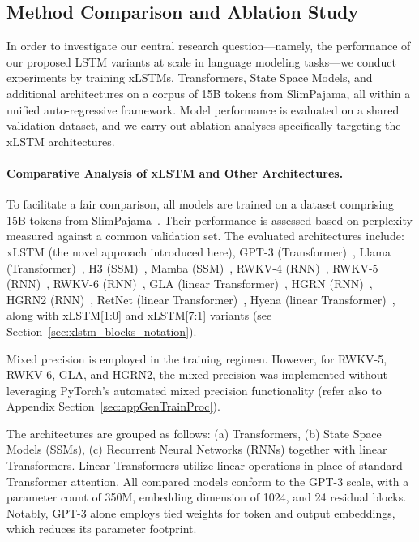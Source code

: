\subsection{Method Comparison and Ablation Study}
\label{sec:ExpComparison}

In order to investigate our central research question—namely, the performance of our proposed LSTM variants at scale in language modeling tasks—we conduct experiments by training xLSTMs, Transformers, State Space Models, and additional architectures on a corpus of 15B tokens from SlimPajama, all within a unified auto-regressive framework. Model performance is evaluated on a shared validation dataset, and we carry out ablation analyses specifically targeting the xLSTM architectures.

\paragraph{Comparative Analysis of xLSTM and Other Architectures.} To facilitate a fair comparison, all models are trained on a dataset comprising 15B tokens from SlimPajama~\citep{Soboleva:23}. Their performance is assessed based on perplexity measured against a common validation set. The evaluated architectures include: xLSTM (the novel approach introduced here), GPT-3 (Transformer)~\citep{Brown:20short}, Llama (Transformer)~\citep{Touvron:23arxiv}, H3 (SSM)~\citep{Fu:23}, Mamba (SSM)~\citep{Gu:24arxiv}, RWKV-4 (RNN)~\citep{Peng:23arxivshort}, RWKV-5 (RNN)~\citep{Peng:24arxivshort}, RWKV-6 (RNN)~\citep{Peng:24arxivshort}, GLA (linear Transformer)~\citep{Yang:23arxiv}, HGRN (RNN)~\citep{Qin:23}, HGRN2 (RNN)~\citep{Qin:24arxiv}, RetNet (linear Transformer)~\citep{Sun:23arxiv}, Hyena (linear Transformer)~\citep{Poli:23}, along with xLSTM[1:0] and xLSTM[7:1] variants (see Section~\ref{sec:xlstm_blocks_notation}). 

Mixed precision is employed in the training regimen. However, for RWKV-5, RWKV-6, GLA, and HGRN2, the mixed precision was implemented without leveraging PyTorch's automated mixed precision functionality (refer also to Appendix Section~\ref{sec:appGenTrainProc}). 

The architectures are grouped as follows: (a) Transformers, (b) State Space Models (SSMs), (c) Recurrent Neural Networks (RNNs) together with linear Transformers. Linear Transformers utilize linear operations in place of standard Transformer attention. All compared models conform to the GPT-3 scale, with a parameter count of 350M, embedding dimension of 1024, and 24 residual blocks. Notably, GPT-3 alone employs tied weights for token and output embeddings, which reduces its parameter footprint.

